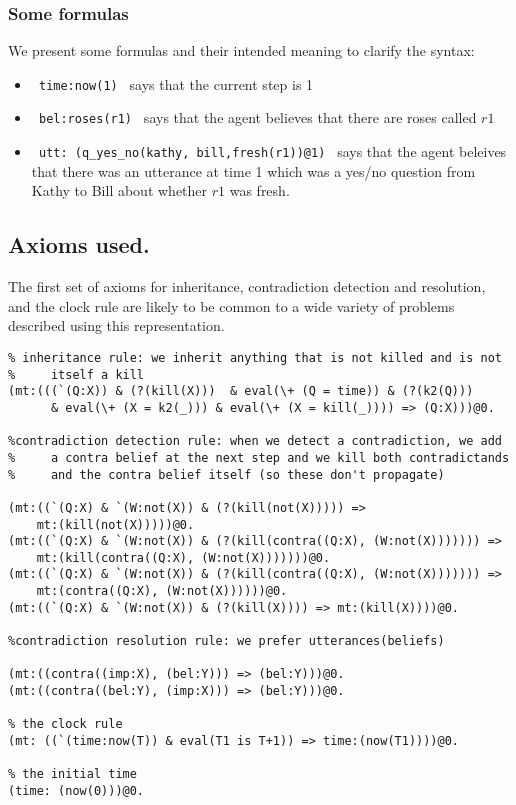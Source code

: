 \documentclass{article}
\begin{document}
\subsubsection{Some formulas}

We present some formulas and their intended meaning to clarify the
syntax: 
\begin{itemize}
\item \verb+ time:now(1) + says that the current step is 1
\item \verb+ bel:roses(r1) + says that the agent believes that there
are roses called $r1$
\item \verb+ utt: (q_yes_no(kathy, bill,fresh(r1))@1) + says that the
agent beleives that there was an utterance at time 1 which was a
yes/no question from Kathy to Bill about whether $r1$ was fresh.
\end{itemize}



\subsection{Axioms used.}

The first set of axioms for inheritance, contradiction detection and
resolution, and the clock rule are likely to be common to a wide
variety of problems described using this representation.

\begin{verbatim}
% inheritance rule: we inherit anything that is not killed and is not
%     itself a kill
(mt:(((`(Q:X)) & (?(kill(X)))  & eval(\+ (Q = time)) & (?(k2(Q))) 
      & eval(\+ (X = k2(_))) & eval(\+ (X = kill(_)))) => (Q:X)))@0.

%contradiction detection rule: when we detect a contradiction, we add
%     a contra belief at the next step and we kill both contradictands
%     and the contra belief itself (so these don't propagate)

(mt:((`(Q:X) & `(W:not(X)) & (?(kill(not(X))))) => 
    mt:(kill(not(X)))))@0.
(mt:((`(Q:X) & `(W:not(X)) & (?(kill(contra((Q:X), (W:not(X))))))) => 
    mt:(kill(contra((Q:X), (W:not(X)))))))@0.
(mt:((`(Q:X) & `(W:not(X)) & (?(kill(contra((Q:X), (W:not(X))))))) => 
    mt:(contra((Q:X), (W:not(X))))))@0.
(mt:((`(Q:X) & `(W:not(X)) & (?(kill(X)))) => mt:(kill(X))))@0.

%contradiction resolution rule: we prefer utterances(beliefs)

(mt:((contra((imp:X), (bel:Y))) => (bel:Y)))@0.
(mt:((contra((bel:Y), (imp:X))) => (bel:Y)))@0.

% the clock rule
(mt: ((`(time:now(T)) & eval(T1 is T+1)) => time:(now(T1))))@0.

% the initial time
(time: (now(0)))@0.
\end{verbatim}
\end{document}
